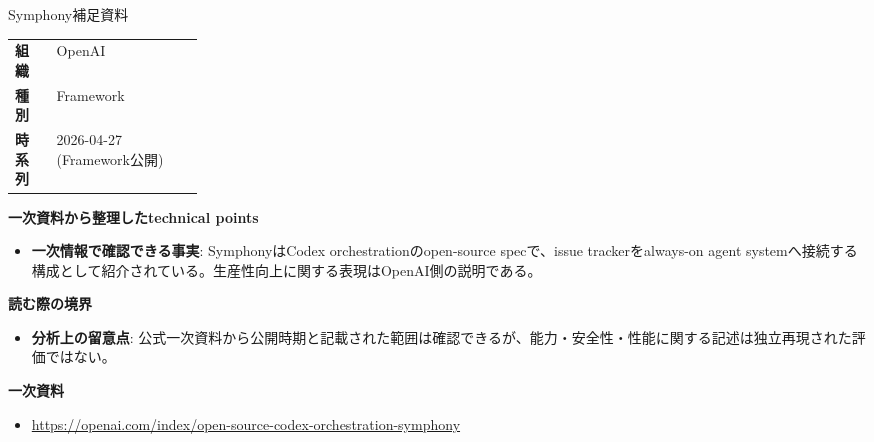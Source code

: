 \begin{technicalnote}{Symphony}{補足資料}
\begingroup
\begin{tabularx}{\linewidth}{@{}>{\bfseries}p{0.22\linewidth}X@{}}
組織 & OpenAI \\
種別 & Framework \\
時系列 & 2026-04-27 (Framework公開) \\
\end{tabularx}
\smallskip
{\bfseries 一次資料から整理したtechnical points}
\begin{itemize}[leftmargin=1.5em,itemsep=0.35em]
\item \textbf{一次情報で確認できる事実}: SymphonyはCodex orchestrationのopen-source specで、issue trackerをalways-on agent systemへ接続する構成として紹介されている。生産性向上に関する表現はOpenAI側の説明である。
\end{itemize}
\begin{minipage}{\linewidth}
{\bfseries 読む際の境界}
\begin{itemize}[leftmargin=1.5em,itemsep=0.35em]
\item \textbf{分析上の留意点}: 公式一次資料から公開時期と記載された範囲は確認できるが、能力・安全性・性能に関する記述は独立再現された評価ではない。
\end{itemize}
\begin{samepage}
{\bfseries 一次資料}
\begingroup\sloppy
\begin{itemize}[leftmargin=1.5em,itemsep=0.25em]
\item {\scriptsize\url{https://openai.com/index/open-source-codex-orchestration-symphony}}
\end{itemize}
\endgroup
\end{samepage}
\end{minipage}
\endgroup
\end{technicalnote}
\medskip
